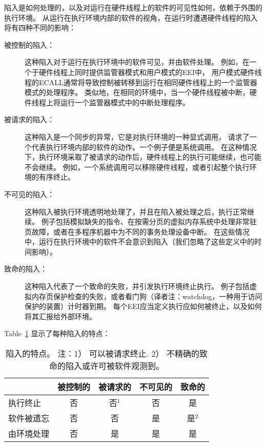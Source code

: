 陷入是如何处理的，以及对运行在硬件线程上的软件的可见性如何，依赖于外围的执行环境。
从运行在执行环境内部的软件的视角，在运行时遭遇硬件线程的陷入将有四种不同的影响：
\begin{description}
  \item[被控制的陷入：] 这种陷入对于运行在执行环境中的软件可见，并由软件处理。
  例如，在一个于硬件线程上同时提供监管器模式和用户模式的EEI中，
  用户模式硬件线程的ECALL通常将导致控制被转移到运行在相同硬件线程上的一个监管器模式的处理程序。
  类似地，在相同的环境中，当一个硬件线程被中断，硬件线程上将运行一个监管器模式中的中断处理程序。
  \item[被请求的陷入：] 这种陷入是一个同步的异常，它是对执行环境的一种显式调用，
  请求了一个代表执行环境内部的软件的动作。一个例子便是系统调用。
  在这种情况下，执行环境采取了被请求的动作后，硬件线程上的执行可能继续，也可能不会继续。
  例如，一个系统调用可以移除硬件线程，或者引起整个执行环境的有序终止。
  \item[不可见的陷入：] 这种陷入被执行环境透明地处理了，并且在陷入被处理之后，执行正常继续。
  例子包括模拟缺失的指令、在按需分页的虚拟内存系统中处理非常驻页故障，或者在多程序机器中为不同的事务处理设备中断。
  在这些情况中，运行在执行环境中的软件不会意识到陷入（我们忽略了这些定义中的时间影响）。
  \item[致命的陷入：] 这种陷入代表了一个致命的失败，并引发执行环境终止执行。
  例子包括虚拟内存页保护检查的失败，或者看门狗（译者注：watchdog，一种用于访问保护的装置）计时器到期。
  每个EEI应当定义执行应如何被终止，以及如何将其汇报给外部环境。
\end{description}

Table~\ref{table:trapcharacteristics} 显示了每种陷入的特点：

\begin{table}[hbt]
  \centering
  \begin{tabular}{|l|c|c|c|c|}
      \hline
                & 被控制的 & 被请求的 & 不可见的 & 致命的\\
      \hline
      执行终止   & 否     & 否$^{1}$ & 否  & 是 \\
      软件被遗忘 & 否     & 否       & 是 & 是$^{2}$ \\
      由环境处理 & 否     & 是       & 是 & 是 \\
      \hline
  \end{tabular}
  \caption{陷入的特点。 注：1） 可以被请求终止. 2） 不精确的致命的陷入或许可被软件观测到。}
\label{table:trapcharacteristics}
\end{table}

